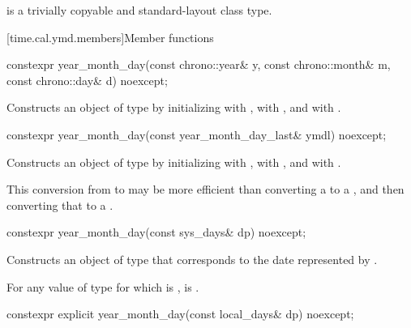 \pnum
{} is a trivially copyable and standard-layout class type.

[time.cal.ymd.members]{Member functions}

%
\begin{itemdecl}
constexpr year_month_day(const chrono::year& y, const chrono::month& m,
                         const chrono::day& d) noexcept;
\end{itemdecl}

\begin{itemdescr}
\pnum
\effects
Constructs an object of type  by
initializing
 with ,
 with , and
 with .
\end{itemdescr}

%
\begin{itemdecl}
constexpr year_month_day(const year_month_day_last& ymdl) noexcept;
\end{itemdecl}

\begin{itemdescr}
\pnum
\effects
Constructs an object of type  by
initializing
 with ,
 with , and
 with .
\begin{note}
This conversion from  to 
may be more efficient than converting a  to a ,
and then converting that  to a .
\end{note}
\end{itemdescr}

%
\begin{itemdecl}
constexpr year_month_day(const sys_days& dp) noexcept;
\end{itemdecl}

\begin{itemdescr}
\pnum
\effects
Constructs an object of type 
that corresponds to the date represented by .

\pnum
\remarks
For any value  of type 
for which  is ,
is .
\end{itemdescr}

%
\begin{itemdecl}
constexpr explicit year_month_day(const local_days& dp) noexcept;
\end{itemdecl}

